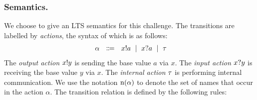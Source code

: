 \documentclass[runningheads]{llncs}
\begin{document}

\subsubsection{Semantics.} We choose to give an LTS semantics for this
challenge. %
The transitions are labelled by \emph{actions}, the syntax
of which is as follows:
\begin{align*}
  \alpha\ \ \Coloneqq\ \ x ! a \ \mid\ x ? a \ \mid\ \tau
\end{align*}
The \emph{output action} \( x ! y \) is sending the base value
\( a \) via \( x \).  The \emph{input action} \( x ? y \) is
receiving the base value \( y \) via \( x \).  The \emph{internal
  action} \( \tau \) is performing internal communication.
%
We use the notation \( \textrm{n}(\alpha) \) to denote the set of
names that occur in the action \( \alpha \).
The transition relation is defined by the following rules:
\end{document}
